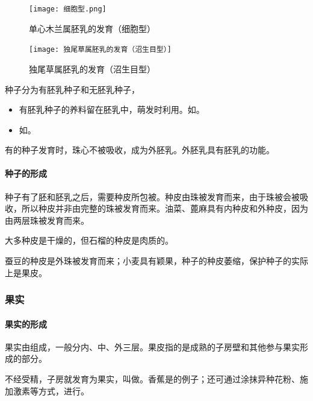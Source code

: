 \begin{figure}[htbp]
	\centering
	\texttt{[image: 细胞型.png]}
	\caption{单心木兰属胚乳的发育（细胞型）}
	\label{fig:单心木兰属胚乳的发育（细胞型）}
\end{figure}

\begin{figure}[htbp]
	\centering
	\texttt{[image: 独尾草属胚乳的发育（沼生目型）]}
	\caption{独尾草属胚乳的发育（沼生目型）}
	\label{fig:独尾草属胚乳的发育（沼生目型）}
\end{figure}

种子分为有胚乳种子和无胚乳种子，

\begin{itemize}
	\item 有胚乳种子的养料留在胚乳中，萌发时利用。如。
	\item {}如。
\end{itemize}


有的种子发育时，珠心不被吸收，成为外胚乳。外胚乳具有胚乳的功能。

\paragraph{种子的形成}

种子有了胚和胚乳之后，需要种皮所包被。种皮由珠被发育而来，由于珠被会被吸收，所以种皮并非由完整的珠被发育而来。油菜、蓖麻具有内种皮和外种皮，因为由两层珠被发育而来。

大多种皮是干燥的，但石榴的种皮是肉质的。

蚕豆的种皮是外珠被发育而来；小麦具有颖果，种子的种皮萎缩，保护种子的实际上是果皮。

\subsubsection{果实}

\paragraph{果实的形成}

果实由组成，一般分内、中、外三层。果皮指的是成熟的子房壁和其他参与果实形成的部分。

不经受精，子房就发育为果实，叫做。香蕉是的例子；还可通过涂抹异种花粉、施加激素等方式，进行。

